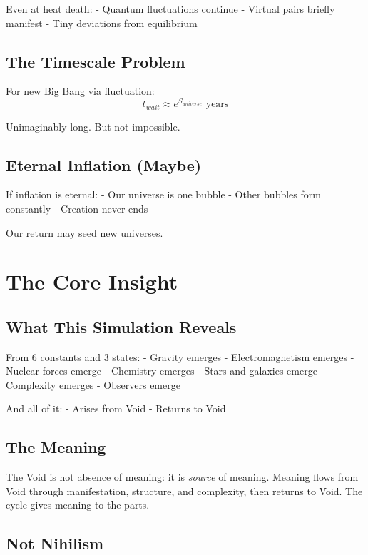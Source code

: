 \documentclass[
  11pt,
  letterpaper,
  twoside,
  openright]{book}
\begin{document}
Even at heat death: - Quantum fluctuations continue - Virtual pairs
briefly manifest - Tiny deviations from equilibrium

\subsection{The Timescale Problem}\label{the-timescale-problem}

For new Big Bang via fluctuation: \[
t_{wait} \approx e^{S_{universe}} \text{ years}
\]

Unimaginably long. But not impossible.

\subsection{Eternal Inflation (Maybe)}\label{eternal-inflation-maybe}

If inflation is eternal: - Our universe is one bubble - Other bubbles
form constantly - Creation never ends

Our return may seed new universes.

\section{The Core Insight}\label{the-core-insight}

\subsection{What This Simulation
Reveals}\label{what-this-simulation-reveals}

From 6 constants and 3 states: - Gravity emerges - Electromagnetism
emerges - Nuclear forces emerge - Chemistry emerges - Stars and galaxies
emerge - Complexity emerges - Observers emerge

And all of it: - Arises from Void - Returns to Void

\subsection{The Meaning}\label{the-meaning}

The Void is not absence of meaning: it is \emph{source} of meaning.
Meaning flows from Void through manifestation, structure, and
complexity, then returns to Void. The cycle gives meaning to the parts.

\subsection{Not Nihilism}\label{not-nihilism}
\end{document}
